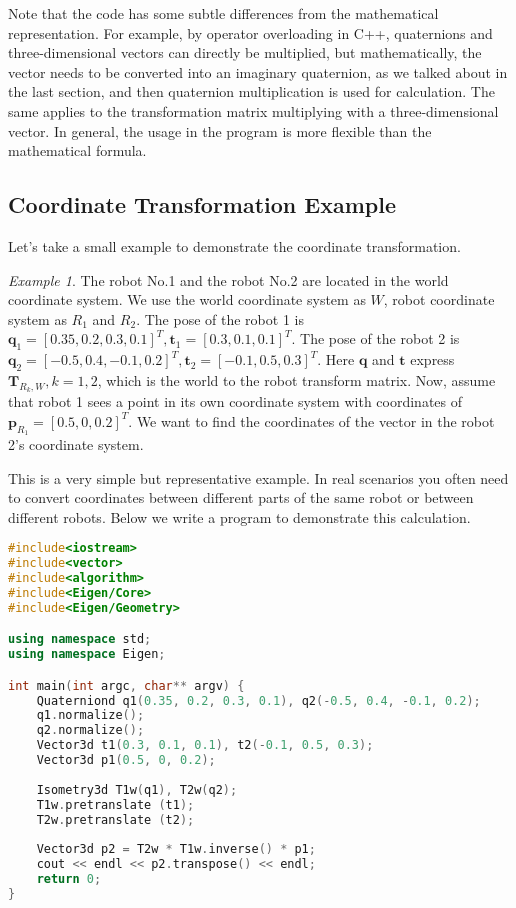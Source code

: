 Note that the code has some subtle differences from the mathematical representation. For example, by operator overloading in C++, quaternions and three-dimensional vectors can directly be multiplied, but mathematically, the vector needs to be converted into an imaginary quaternion, as we talked about in the last section, and then quaternion multiplication is used for calculation. The same applies to the transformation matrix multiplying with a three-dimensional vector. In general, the usage in the program is more flexible than the mathematical formula.

\subsection{Coordinate Transformation Example}

Let's take a small example to demonstrate the coordinate transformation.

\noindent  \textit{Example 1}. \quad  The robot No.1 and the robot No.2 are located in the world coordinate system. We use the world coordinate system as $W$, robot coordinate system as $R_1 $ and $R_2$. The pose of the robot 1 is $ \mathbf {q}_ 1 = [ 0.35, 0.2, 0.3, 0.1 ]^T, \mathbf{t}_ 1 = [ 0.3, 0.1, 0.1 ]^T $. The pose of the robot 2 is $ \mathbf{q}_2 = [ - 0.5, 0.4, - 0.1, 0.2 ]^T, \mathbf{t}_ 2 = [- 0.1, 0.5, 0.3 ]^T $. Here $ \mathbf {q} $ and $ \mathbf{t} $ express $ \mathbf{T}_{R_k, W}, k= 1, 2 $, which is the world to the robot transform matrix. Now, assume that robot 1 sees a point in its own coordinate system with coordinates of $ \mathbf{p}_{R_1} = [ 0.5, 0, 0.2 ]^T $. We want to find the coordinates of the vector in the robot 2's coordinate system.

This is a very simple but representative example. In real scenarios you often need to convert coordinates between different parts of the same robot or between different robots. Below we write a program to demonstrate this calculation.

\begin{lstlisting}[language=c++,caption=slambook2/ch3/examples/coordinateTransform.cpp]
#include<iostream>
#include<vector>
#include<algorithm>
#include<Eigen/Core>
#include<Eigen/Geometry>

using namespace std;
using namespace Eigen;

int main(int argc, char** argv) {
	Quaterniond q1(0.35, 0.2, 0.3, 0.1), q2(-0.5, 0.4, -0.1, 0.2);
	q1.normalize();
	q2.normalize();
	Vector3d t1(0.3, 0.1, 0.1), t2(-0.1, 0.5, 0.3);
	Vector3d p1(0.5, 0, 0.2);
	
	Isometry3d T1w(q1), T2w(q2);
	T1w.pretranslate (t1);
	T2w.pretranslate (t2);
	
	Vector3d p2 = T2w * T1w.inverse() * p1;
	cout << endl << p2.transpose() << endl;
	return 0;
}
\end{lstlisting}


